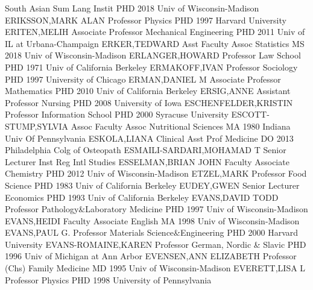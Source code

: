 \documentclass[
]{article}
\begin{document}
\textbar South Asian Sum Lang Instit \textbar{}  \textbar PHD
2018 Univ of Wisconsin-Madison \textbar ERIKSSON,MARK ALAN
\textbar Professor \textbar Physics \textbar{}  \textbar PHD
1997 Harvard University \textbar ERITEN,MELIH \textbar Associate
Professor \textbar Mechanical Engineering \textbar{} 
\textbar PHD 2011 Univ of IL at Urbana-Champaign \textbar ERKER,TEDWARD
\textbar Asst Faculty Assoc \textbar Statistics \textbar{} 
\textbar MS 2018 Univ of Wisconsin-Madison \textbar ERLANGER,HOWARD
\textbar Professor \textbar Law School \textbar{} 
\textbar PHD 1971 Univ of California Berkeley \textbar ERMAKOFF,IVAN
\textbar Professor \textbar Sociology \textbar{} 
\textbar PHD 1997 University of Chicago \textbar ERMAN,DANIEL M
\textbar Associate Professor \textbar Mathematics \textbar{} 
\textbar PHD 2010 Univ of California Berkeley \textbar ERSIG,ANNE
\textbar Assistant Professor \textbar Nursing \textbar{} 
\textbar PHD 2008 University of Iowa \textbar ESCHENFELDER,KRISTIN
\textbar Professor \textbar Information School \textbar{} 
\textbar PHD 2000 Syracuse University \textbar ESCOTT-STUMP,SYLVIA
\textbar Assoc Faculty Assoc \textbar Nutritional Sciences \textbar{}
 \textbar MA 1980 Indiana Univ Of Pennsylvania
\textbar ESKOLA,LIANA \textbar Clinical Asst Prof \textbar Medicine
\textbar{}  \textbar DO 2013 Philadelphia Colg of Osteopath
\textbar ESMAILI-SARDARI,MOHAMAD T \textbar Senior Lecturer
\textbar Inst Reg Intl Studies \textbar{} 
\textbar ESSELMAN,BRIAN JOHN \textbar Faculty Associate
\textbar Chemistry \textbar PHD 2012 Univ of Wisconsin-Madison
\textbar{}  \textbar ETZEL,MARK \textbar Professor
\textbar Food Science \textbar PHD 1983 Univ of California Berkeley
\textbar{}  \textbar EUDEY,GWEN \textbar Senior Lecturer
\textbar Economics \textbar PHD 1993 Univ of California Berkeley
\textbar{}  \textbar EVANS,DAVID TODD \textbar Professor
\textbar Pathology\&Laboratory Medicine \textbar PHD 1997 Univ of
Wisconsin-Madison \textbar{}  \textbar EVANS,HEIDI
\textbar Faculty Associate \textbar English \textbar MA 1998 Univ of
Wisconsin-Madison \textbar{}  \textbar EVANS,PAUL G.
\textbar Professor \textbar Materials Science\&Engineering \textbar PHD
2000 Harvard University \textbar{} 
\textbar EVANS-ROMAINE,KAREN \textbar Professor \textbar German, Nordic
\& Slavic \textbar PHD 1996 Univ of Michigan at Ann Arbor \textbar{}
 \textbar EVENSEN,ANN ELIZABETH \textbar Professor (Chs)
\textbar Family Medicine \textbar MD 1995 Univ of Wisconsin-Madison
\textbar{}  \textbar EVERETT,LISA L \textbar Professor
\textbar Physics \textbar PHD 1998 University of Pennsylvania \textbar{}
 \textbar{}
\end{document}
